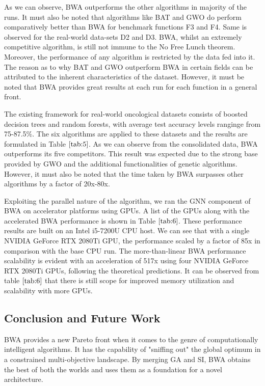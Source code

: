 \documentclass[conference]{IEEEtran}
\begin{document}
As we can observe, BWA outperforms the other algorithms in majority of the runs. It must also be noted that algorithms like BAT and GWO do perform comparatively better than BWA for benchmark functions F3 and F4. Same is observed for the real-world data-sets D2 and D3. BWA, whilst an extremely competitive algorithm, is still not immune to the No Free Lunch theorem. Moreover, the performance of any algorithm is restricted by the data fed into it. The reason as to why BAT and GWO outperform BWA in certain fields can be attributed to the inherent characteristics of the dataset. However, it must be noted that BWA provides great results at each run for each function in a general front. 

The existing framework for real-world oncological datasets consists of boosted decision trees and random forests, with average test accuracy levels ranginge from 75-87.5\%. The six algorithms are applied to these datasets and the results are formulated in Table $\ref{tab:5}$. As we can observe from the consolidated data, BWA outperforms its five competitors. This result was expected due to the strong base provided by GWO and the additional functionalities of genetic algorithms. However, it must also be noted that the time taken by BWA surpasses other algorithms by a factor of 20x-80x. 

Exploiting the parallel nature of the algorithm, we ran the GNN component of BWA on accelerator platforms using GPUs. A list of the GPUs along with the accelerated BWA performance is shown in Table $\ref{tab:6}$. These performance results are built on an Intel i5-7200U CPU host. We can see that with a single NVIDIA GeForce RTX 2080Ti GPU, the performance scaled by a factor of 85x in comparison with the base CPU run. The more-than-linear BWA performance scalability is evident with an acceleration of 517x using four NVIDIA GeForce RTX 2080Ti GPUs, following the theoretical predictions. It can be observed from table $\ref{tab:6}$ that there is still scope for improved memory utilization and scalability with more GPUs. 

\subsection{Conclusion and Future Work}

BWA provides a new Pareto front when it comes to the genre of computationally intelligent algorithms. It has the capability of "sniffing out" the global optimum in a constrained multi-objective landscape. By merging GA and SI, BWA obtains the best of both the worlds and uses them as a foundation for a novel architecture. 
\end{document}
